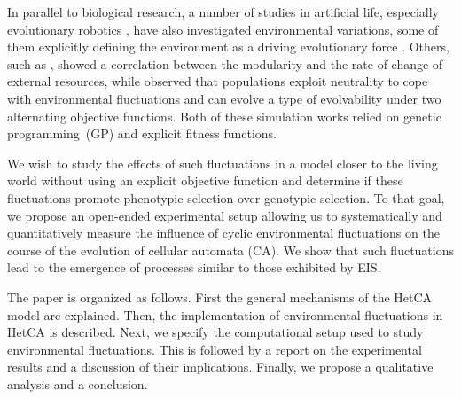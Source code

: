 In parallel to biological research, a number of studies in artificial life, especially evolutionary robotics \citep{floreano2000evolutionary}, have also investigated environmental variations, some of them explicitly defining the environment as a driving evolutionary force \citep{bredeche2012environmentdrivenopenende}.
Others, such as \citet{lipson2002origin}, showed a correlation between the modularity and the rate of change of external resources, while \citet{yu2007program} observed that populations exploit neutrality to cope with environmental fluctuations and can evolve a type of evolvability under two alternating objective functions. Both of these simulation works relied on genetic programming~(GP) and explicit fitness functions.

We wish to study the effects of such fluctuations in a model closer to the living world without using an explicit objective function and determine if these fluctuations promote phenotypic selection over genotypic selection. To that goal, we propose an open-ended experimental setup allowing us to systematically and quantitatively measure the influence of cyclic environmental fluctuations on the course of the evolution of cellular automata (CA). We show that such fluctuations lead to the emergence of processes similar to those exhibited by EIS.

The paper is organized as follows. First the general mechanisms of the HetCA model are explained. Then, the implementation of environmental fluctuations in HetCA is described. Next, we specify the computational setup used to study environmental fluctuations. This is followed by a report on the experimental results and a discussion of their implications. Finally, we propose a qualitative analysis and a conclusion.
